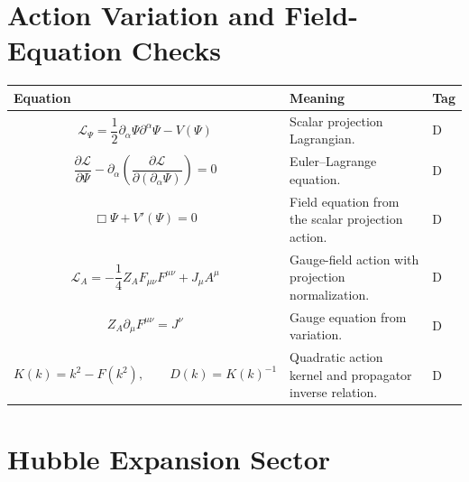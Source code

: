 \documentclass[11pt]{article}
\begin{document}
\section{Action Variation and Field-Equation Checks}
\begin{longtable}{>{\raggedright\arraybackslash}p{} >{\raggedright\arraybackslash}p{} >{\centering\arraybackslash}p{}}
\toprule
\textbf{Equation} & \textbf{Meaning} & \textbf{Tag} \\
\midrule
\endhead

\begin{equation}
\mathcal L_\Psi=\frac12\partial_\alpha\Psi\partial^\alpha\Psi-V(\Psi)
\end{equation}
& Scalar projection Lagrangian. & D \\

\begin{equation}
\frac{\partial \mathcal L}{\partial \Psi}-\partial_\alpha\left(\frac{\partial\mathcal L}{\partial(\partial_\alpha\Psi)}\right)=0
\end{equation}
& Euler--Lagrange equation. & D \\

\begin{equation}
\Box\Psi+V'(\Psi)=0
\end{equation}
& Field equation from the scalar projection action. & D \\

\begin{equation}
\mathcal L_A=-\frac14Z_AF_{\mu\nu}F^{\mu\nu}+J_\mu A^\mu
\end{equation}
& Gauge-field action with projection normalization. & D \\

\begin{equation}
Z_A\partial_\mu F^{\mu\nu}=J^\nu
\end{equation}
& Gauge equation from variation. & D \\

\begin{equation}
K(k)=k^2-F(k^2),
\qquad D(k)=K(k)^{-1}
\end{equation}
& Quadratic action kernel and propagator inverse relation. & D \\

\bottomrule
\end{longtable}

\section{Hubble Expansion Sector}
\end{document}
